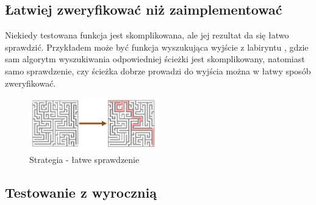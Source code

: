 \subsection{Łatwiej zweryfikować niż zaimplementować}
Niekiedy testowana funkcja jest skomplikowana, ale jej rezultat da się łatwo sprawdzić. Przykładem może być funkcja wyszukująca wyjście z labiryntu , gdzie sam algorytm wyszukiwania odpowiedniej ścieżki jest skomplikowany, 
natomiast samo sprawdzenie, czy ścieżka dobrze prowadzi do wyjścia można w łatwy sposób zweryfikować.

\begin{figure}
    \centering
    \includegraphics[width=0.5\textwidth]{images/property_easy_verification.png}
    \caption{Strategia - łatwe sprawdzenie}
    \label{fig:easy_verification_strategy}
\end{figure}

\subsection{Testowanie z wyrocznią}
